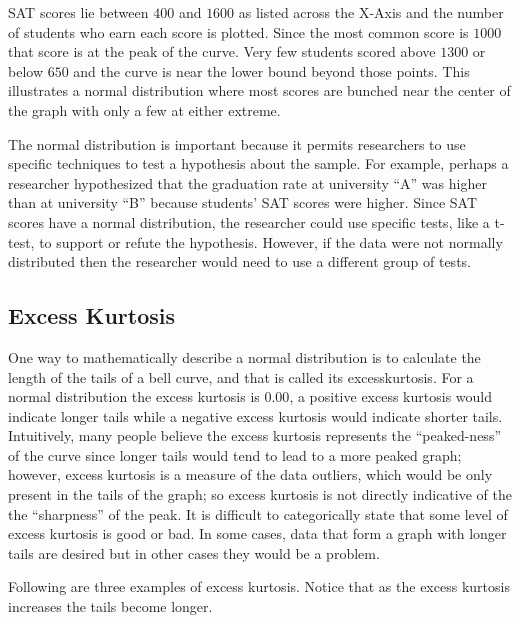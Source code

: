 SAT scores lie between $ 400 $ and $ 1600 $ as listed across the X-Axis and the number of students who earn each score is plotted. Since the most common score is $ 1000 $ that score is at the peak of the curve. Very few students scored above $ 1300 $ or below $ 650 $ and the curve is near the lower bound beyond those points. This illustrates a normal distribution where most scores are bunched near the center of the graph with only a few at either extreme.

The normal distribution is important because it permits researchers to use specific techniques to test a hypothesis about the sample. For example, perhaps a researcher hypothesized that the graduation rate at university ``A'' was higher than at university ``B'' because students' SAT scores were higher. Since SAT scores have a normal distribution, the researcher could use specific tests, like a t-test, to support or refute the hypothesis. However, if the data were not normally distributed then the researcher would need to use a different group of tests.

\subsection{Excess Kurtosis}
One way to mathematically describe a normal distribution is to calculate the length of the tails of a bell curve, and that is called its \gls{excesskurtosis}. For a normal distribution the excess kurtosis is $ 0.00 $, a positive excess kurtosis would indicate longer tails while a negative excess kurtosis would indicate shorter tails. Intuitively, many people believe the excess kurtosis represents the ``peaked-ness'' of the curve since longer tails would tend to lead to a more peaked graph; however, excess kurtosis is a measure of the data outliers, which would be only present in the tails of the graph; so excess kurtosis is not directly indicative of the the ``sharpness'' of the peak. It is difficult to categorically state that some level of excess kurtosis is good or bad. In some cases, data that form a graph with longer tails are desired but in other cases they would be a problem.

Following are three examples of excess kurtosis. Notice that as the excess kurtosis increases the tails become longer. 


